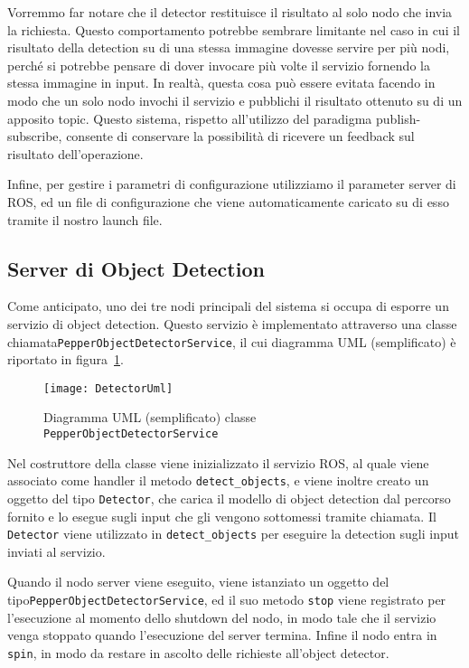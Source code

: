 Vorremmo far notare che il detector restituisce il risultato al solo nodo che invia la richiesta. Questo comportamento potrebbe sembrare limitante nel caso in cui il risultato della detection su di una stessa immagine dovesse servire per più nodi, perché si potrebbe pensare di dover invocare più volte il servizio fornendo la stessa immagine in input. In realtà, questa cosa può essere evitata facendo in modo che un solo nodo invochi il servizio e pubblichi il risultato ottenuto su di un apposito topic. Questo sistema, rispetto all'utilizzo del paradigma publish-subscribe, consente di conservare la possibilità di ricevere un feedback sul risultato dell'operazione. 

Infine, per gestire i parametri di configurazione utilizziamo il parameter server di ROS, ed un file di configurazione che viene automaticamente caricato su di esso tramite il nostro launch file. 

\subsection{Server di Object Detection}

Come anticipato, uno dei tre nodi principali del sistema si occupa di esporre un servizio di object detection. 
Questo servizio è implementato attraverso una classe chiamata\linebreak\verb|PepperObjectDetectorService|, il cui diagramma UML (semplificato) è riportato in figura~\ref{fig:detector_uml}.

\begin{figure}[ht]
	\centering
	\texttt{[image: DetectorUml]}
	\caption{Diagramma UML (semplificato) classe \texttt{PepperObjectDetectorService}}
	\label{fig:detector_uml}
\end{figure}

Nel costruttore della classe viene inizializzato il servizio ROS, al quale viene associato come handler il metodo \verb|detect_objects|, e viene inoltre creato un oggetto del tipo \verb|Detector|, che carica il modello di object detection dal percorso fornito e lo esegue sugli input che gli vengono sottomessi tramite chiamata. Il \verb|Detector| viene utilizzato in \verb|detect_objects| per eseguire la detection sugli input inviati al servizio.

Quando il nodo server viene eseguito, viene istanziato un oggetto del tipo\linebreak\verb|PepperObjectDetectorService|, ed il suo metodo \verb|stop| viene registrato per l'esecuzione al momento dello shutdown del nodo, in modo tale che il servizio venga stoppato quando l'esecuzione del server termina.
Infine il nodo entra in \verb|spin|, in modo da restare in ascolto delle richieste all'object detector.

